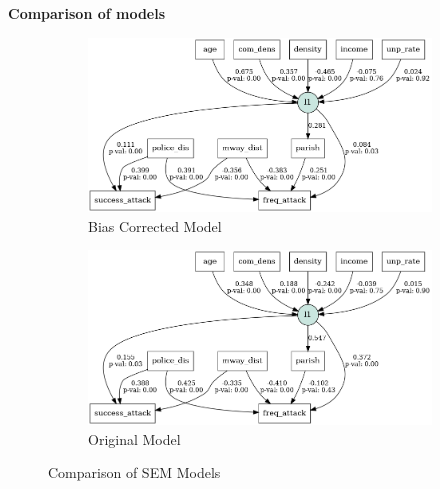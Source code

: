 \documentclass[10pt, conference, compsocconf]{IEEEtran}
\begin{document}
\newpage
\textbf{Comparison of models}
\vspace{2cm}
\begin{figure}[H]
	
	\begin{subfigure}[b]{\linewidth}
		\includegraphics[height=0.2\textheight]{semresultbias.png}
		\caption{Bias Corrected Model}
		\label{bias}
	\end{subfigure}%

\vspace{2cm}

	\begin{subfigure}[b]{\linewidth}
		\includegraphics[height=0.2\textheight]{semresult2.png}
		\caption{Original Model}
		\label{fig:Model}
	\end{subfigure}

	\caption{Comparison of SEM Models}
	
\end{figure}
\end{document}
